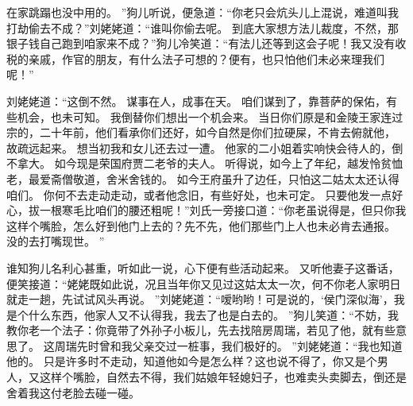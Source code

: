 在家跳蹋也没中用的。
”狗儿听说，便急道：“你老只会炕头儿上混说，难道叫我打劫偷去不成？”刘姥姥道：“谁叫你偷去呢。
到底大家想方法儿裁度，不然，那银子钱自己跑到咱家来不成？”狗儿冷笑道：“有法儿还等到这会子呢！我又没有收税的亲戚，作官的朋友，有什么法子可想的？便有，也只怕他们未必来理我们呢！”\par
刘姥姥道：“这倒不然。
谋事在人，成事在天。
咱们谋到了，靠菩萨的保佑，有些机会，也未可知。
我倒替你们想出一个机会来。
当日你们原是和金陵王家连过宗的，二十年前，他们看承你们还好，如今自然是你们拉硬屎，不肯去俯就他，
故疏远起来。
想当初我和女儿还去过一遭。
他家的二小姐着实响快会待人的，倒不拿大。
如今现是荣国府贾二老爷的夫人。
听得说，如今上了年纪，越发怜贫恤老，最爱斋僧敬道，舍米舍钱的。
如今王府虽升了边任，只怕这二姑太太还认得咱们。
你何不去走动走动，或者他念旧，有些好处，也未可定。
只要他发一点好心，拔一根寒毛比咱们的腰还粗呢！”刘氏一旁接口道：“你老虽说得是，但只你我这样个嘴脸，怎么好到他门上去的？先不先，他们那些门上人也未必肯去通报。
没的去打嘴现世。
”\par
谁知狗儿名利心甚重，听如此一说，心下便有些活动起来。
又听他妻子这番话，便笑接道：“姥姥既如此说，况且当年你又见过这姑太太一次，何不你老人家明日就走一趟，先试试风头再说。
”刘姥姥道：“嗳哟哟！可是说的，‘侯门深似海’，我是个什么东西，他家人又不认得我，我去了也是白去的。
”狗儿笑道：“不妨，我教你老一个法子：你竟带了外孙子小板儿，先去找陪房周瑞，若见了他，就有些意思了。
这周瑞先时曾和我父亲交过一桩事，我们极好的。
”刘姥姥道：“我也知道他的。
只是许多时不走动，知道他如今是怎么样？这也说不得了，你又是个男人，又这样个嘴脸，自然去不得，我们姑娘年轻媳妇子，也难卖头卖脚去，倒还是舍着我这付老脸去碰一碰。
